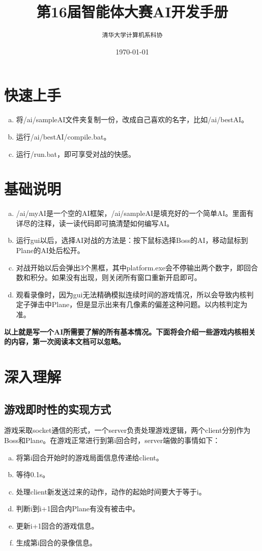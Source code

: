 \documentclass[11pt,a4paper]{article}
\begin{document}
\title{\textbf{第16届智能体大赛AI开发手册}}
\author{\texttt{清华大学计算机系科协}}
\date{\today}
\maketitle
\thispagestyle{empty}

\section{快速上手}
\begin{enumerate}[(a)]
\item 将/ai/sampleAI文件夹复制一份，改成自己喜欢的名字，比如/ai/bestAI。
\item 运行/ai/bestAI/compile.bat。
\item 运行/run.bat，即可享受对战的快感。
\end{enumerate}

\section{基础说明}
\begin{enumerate}[(a)]
\item /ai/myAI是一个空的AI框架，/ai/sampleAI是填充好的一个简单AI。里面有详尽的注释，读一读代码即可搞清楚如何编写AI。
\item 运行gui以后，选择AI对战的方法是：按下鼠标选择Boss的AI，移动鼠标到Plane的AI处后松开。
\item 对战开始以后会弹出3个黑框，其中platform.exe会不停输出两个数字，即回合数和积分。如果没有出现，则关闭所有窗口重新开启即可。
\item 观看录像时，因为gui无法精确模拟连续时间的游戏情况，所以会导致内核判定子弹击中Plane，但是显示出来有几像素的偏差这种问题。以内核判定为准。
\end{enumerate}

\textbf{以上就是写一个AI所需要了解的所有基本情况。下面将会介绍一些游戏内核相关的内容，第一次阅读本文档可以忽略。}

\section{深入理解}
\subsection{游戏即时性的实现方式}
游戏采取socket通信的形式，一个server负责处理游戏逻辑，两个client分别作为Boss和Plane。在游戏正常进行到第i回合时，server端做的事情如下：
\begin{enumerate}[(a)]
\item 将第i回合开始时的游戏局面信息传递给client。
\item 等待0.1s。
\item 处理client新发送过来的动作，动作的起始时间要大于等于i。
\item 判断i到i+1回合内Plane有没有被击中。
\item 更新i+1回合的游戏信息。
\item 生成第i回合的录像信息。
\end{enumerate}
\end{document}
